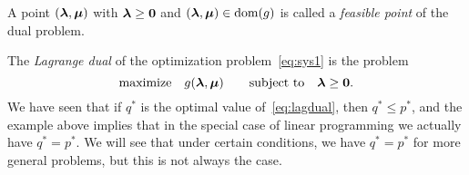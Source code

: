 A point $(\bm{\lambda},\bm{\mu})$ with $\bm{\lambda}\geq \bm{0}$ and $(\bm{\lambda},\bm{\mu})\in \mathrm{dom}(g)$ is called a {\em feasible point} of the dual problem.

The {\em Lagrange dual} of the optimization problem~\eqref{eq:sys1} is the problem
\begin{equation}\label{eq:lagdual}
 \text{maximize}\quad g(\bm{\lambda},\bm{\mu}) \quad \quad\text{subject to}\quad \bm{\lambda}\geq \bm{0}.
\end{equation}
We have seen that if $q^*$ is the optimal value of~\eqref{eq:lagdual}, then $q^*\leq p^*$, and the example above implies that in the special case of linear programming we actually have $q^*=p^*$. We will see that under certain conditions, we have $q^*=p^*$ for more general problems, but this is not always the case.



